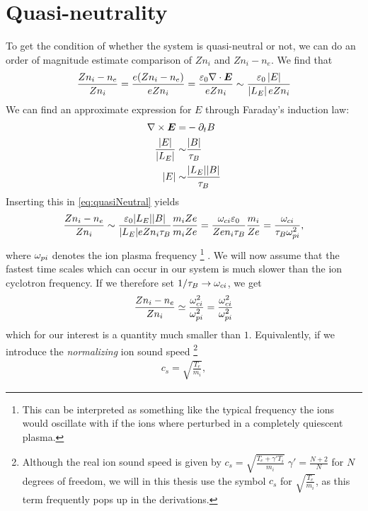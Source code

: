\section{Quasi-neutrality}
\label{sec:qn}
To get the condition of whether the system is quasi-neutral or not, we can do an order of magnitude estimate comparison of $Zn_i$ and $Zn_i - n_e$.
We find that
%
\begin{align}
    \frac{Zn_i - n_e}{Zn_i} =
    \frac{e(Zn_i - n_e)}{eZn_i}
    =
    \frac{\varepsilon_0\nabla\cdot\boldsymbol{E}}{eZn_i}
    \sim
    \frac{\varepsilon_0\left|E\right|}{\left|L_E\right|eZn_i}
    \label{eq:quasiNeutral}
\end{align}
%
We can find an approximate expression for $E$ through Faraday's induction law:
%
\begin{align*}
    \nabla\times\boldsymbol{E} =& -\partial_t B\\
    \frac{|E|}{|L_E|} \sim& \frac{|B|}{\tau_B}\\
    |E| \sim& \frac{|L_E||B|}{\tau_B}
\end{align*}
%
Inserting this in \cref{eq:quasiNeutral} yields
%
\begin{align*}
    \frac{Zn_i - n_e}{Zn_i}
    \sim
    \frac{\varepsilon_0 |L_E||B|}{|L_E| e Zn_i \tau_B}\frac{m_i Ze}{m_i Ze}
    =
    \frac{\omega_{ci}\varepsilon_0}{Z e n_i\tau_B}\frac{m_i}{Z e}
    =
    \frac{\omega_{ci}}{\tau_B\omega_{pi}^2},
\end{align*}
%
where $\omega_{pi}$ denotes the ion plasma frequency%
\footnote{This can be interpreted as something like the typical frequency the ions would oscillate with if the ions where perturbed in a completely quiescent plasma.}
%
.
We will now assume that the fastest time scales which can occur in our system is much slower than the ion cyclotron frequency.
If we therefore set $1/\tau_B\to\omega_{ci}$, we get
%
\begin{align}
    \frac{Zn_i - n_e}{Zn_i}
    \simeq
    \frac{\omega_{ci}^2}{\omega_{pi}^2}
    =
    \frac{\omega_{ci}^2}{\omega_{pi}^2}
    \label{eq:quasiNCompare}
\end{align}
%
which for our interest is a quantity much smaller than $1$.
Equivalently, if we introduce the \emph{normalizing} ion sound speed%
%
\footnote{Although the real ion sound speed is given by $c_s=\sqrt{\frac{T_e+\gamma' T_i}{m_i}}\;\gamma'=\frac{N+2}{N}$ for $N$ degrees of freedom, we will in this thesis use the symbol $c_s$ for $\sqrt{\frac{T_e}{m_i}}$, as this term frequently pops up in the derivations.}
%
\begin{align*}
    c_s = \sqrt{\frac{T_e}{m_i}},
\end  {align*}
